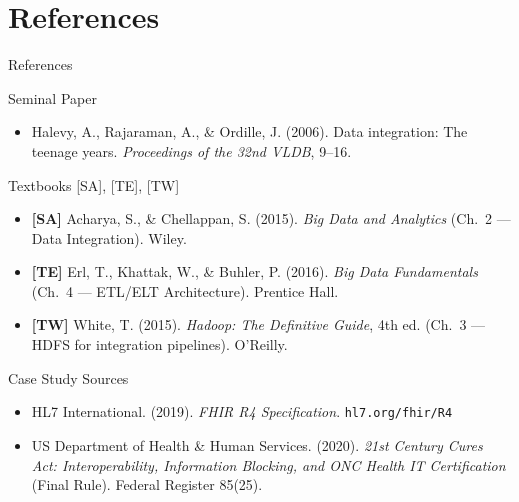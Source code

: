 \documentclass[aspectratio=169,10pt]{beamer}
\begin{document}
\section*{References}

\begin{frame}{References}
  \begin{block}{Seminal Paper}
    \begin{itemize}
      \item Halevy, A., Rajaraman, A., \& Ordille, J. (2006).
            Data integration: The teenage years.
            \textit{Proceedings of the 32nd VLDB}, 9--16.
    \end{itemize}
  \end{block}
  \vspace{4pt}
  \begin{block}{Textbooks \textmd{[SA], [TE], [TW]}}
    \begin{itemize}
      \item \textbf{[SA]} Acharya, S., \& Chellappan, S. (2015).
            \textit{Big Data and Analytics} (Ch.~2 — Data Integration).
            Wiley.
      \item \textbf{[TE]} Erl, T., Khattak, W., \& Buhler, P. (2016).
            \textit{Big Data Fundamentals} (Ch.~4 — ETL/ELT Architecture).
            Prentice Hall.
      \item \textbf{[TW]} White, T. (2015).
            \textit{Hadoop: The Definitive Guide}, 4th ed.
            (Ch.~3 — HDFS for integration pipelines). O'Reilly.
    \end{itemize}
  \end{block}
  \vspace{4pt}
  \begin{block}{Case Study Sources}
    \begin{itemize}
      \item HL7 International. (2019). \textit{FHIR R4 Specification}.
            \texttt{hl7.org/fhir/R4}
      \item US Department of Health \& Human Services. (2020).
            \textit{21st Century Cures Act: Interoperability, Information Blocking,
            and ONC Health IT Certification} (Final Rule). Federal Register 85(25).
    \end{itemize}
  \end{block}
\end{frame}
\end{document}
